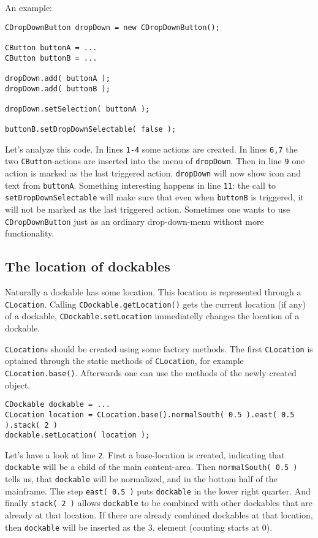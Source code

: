 \documentclass[a4paper,10pt]{article}
\newcommand{\src}[1]{\lstinline[basicstyle=\ttfamily]|#1|}
\begin{document}
An example:
\begin{lstlisting}
CDropDownButton dropDown = new CDropDownButton();

CButton buttonA = ...
CButton buttonB = ...

dropDown.add( buttonA );
dropDown.add( buttonB );

dropDown.setSelection( buttonA );

buttonB.setDropDownSelectable( false );
\end{lstlisting}
Let's analyze this code. In lines \src{1-4} some actions are created. In lines \src{6,7} the two \src{CButton}-actions are inserted into the menu of \src{dropDown}. Then in line \src{9} one action is marked as the last triggered action. \src{dropDown} will now show icon and text from \src{buttonA}. Something interesting happens in line \src{11}: the call to \src{setDropDownSelectable} will make sure that even when \src{buttonB} is triggered, it will not be marked as the last triggered action. Sometimes one wants to use \src{CDropDownButton} just as an ordinary drop-down-menu without more functionality.

\subsection{The location of dockables}
Naturally a dockable has some location. This location is represented through a \src{CLocation}. Calling \src{CDockable.getLocation()} gets the current location (if any) of a dockable, \src{CDockable.setLocation} immediatelly changes the location of a dockable.

\src{CLocation}s should be created using some factory methods. The first \src{CLocation} is optained through the static methods of \src{CLocation}, for example \src{CLocation.base()}. Afterwards one can use the methods of the newly created object.
\begin{lstlisting}
CDockable dockable = ...
CLocation location = CLocation.base().normalSouth( 0.5 ).east( 0.5 ).stack( 2 )
dockable.setLocation( location );
\end{lstlisting}
Let's have a look at line \src{2}. First a base-location is created, indicating that \src{dockable} will be a child of the main content-area. Then \src{normalSouth( 0.5 )} tells us, that \src{dockable} will be normalized, and in the bottom half of the mainframe. The step \src{east( 0.5 )} puts \src{dockable} in the lower right quarter. And finally \src{stack( 2 )} allows \src{dockable} to be combined with other dockables that are already at that location. If there are already combined dockables at that location, then \src{dockable} will be inserted as the 3. element (counting starts at 0).
\end{document}
